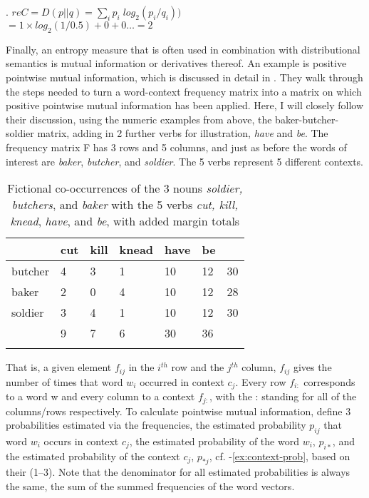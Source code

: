 \ex. $reC = D(p||q) = \sum_i p_i \; log_2 (p_i/q_i))$\\
$= 1 \times log_2 (1/0.5) + 0 + 0 \dots= 2$

Finally, an entropy measure that is often used in combination with
distributional semantics is mutual information or derivatives
thereof. An example is positive pointwise mutual information, which
is discussed in detail in \citet[157--158]{TurneyandPantel:2010}. They
walk through the steps needed to turn a word-context frequency matrix
into a matrix on which positive pointwise mutual information has been
applied. Here, I will closely follow their discussion, using the
numeric examples from above, the baker-butcher-soldier matrix,
adding in 2 further verbs for illustration, \emph{have} and \emph{be}. The
frequency matrix F has 3 rows and 5 columns, and just as before the words of interest are \emph{baker}, \emph{butcher}, and \emph{soldier}. The 5 verbs represent 5 different
contexts. 

\begin{table}[!htb]
  \centering
  \begin{tabularx}{.8\textwidth}{lR{1cm}R{1cm}R{1cm}R{1cm}R{1cm}R{1cm}}\lsptoprule
&cut&kill&knead&have&be&\\\midrule
butcher  &4&3&1&10&12&30\\
baker&2&0&4&10&12&28\\
soldier&3&4&1&10&12&30\\\midrule
&9&7&6&30&36&\\\lspbottomrule
  \end{tabularx}
  \caption{Fictional co-occurrences of the 3 nouns \emph{soldier,
      butchers}, and \emph{baker} with the 5 verbs
    \emph{cut, kill, knead}, \emph{have}, and \emph{be}, with added
    margin totals}
  \label{tab:soldiers-and-more}

\end{table}

That is, a given element $f_{ij}$ in the $i^{th}$ row and the $j^{th}$ column,
$f_{ij}$ gives the number of times that word $w_i$ occurred in context
$c_j$. Every row $f_{i:}$ corresponds to a word w and every column to
a context $f_{j:}$, with the : standing for all of the columns/rows
respectively. To calculate pointwise mutual information, \citet[157]{TurneyandPantel:2010} define
3 probabilities estimated via the frequencies, the estimated
probability $p_{ij}$ that word $w_i$ occurs in context $c_j$, the estimated
probability of the word $w_i$, $p_{i*}$,  and the estimated probability of the
context $c_j$, $p_{*j}$, cf. \Next-\ref{ex:context-prob}, based on
their (1--3). Note that the denominator for all estimated probabilities
is always the same, the sum of the summed frequencies of the word vectors. 

